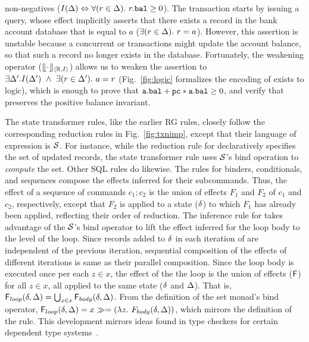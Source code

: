 non-negatives ($I(\Delta) \Leftrightarrow \forall(r\in\Delta).~r.{\tt bal}\ge
0$). The transaction starts by issuing a  query, whose
effect implicitly asserts that there exists a record in the bank
account database that is equal to $a$
($\exists(r\in\Delta).~r=a$). However, this assertion is unstable
because a concurrent  or  transactions might
update the account balance, so that such a record no longer exists in
the database.  Fortunately, the weakening operator
($\llfloor \cdot \rrfloor_{\langle \mathbb{R},I \rangle}$) allows us to weaken the assertion to $\exists
\Delta'.I(\Delta') ~\wedge~ \exists(r\in\Delta').~a=r$ (Fig.~\ref{fig:logic}
formalizes the encoding of {\sf exists} to logic), which is enough to
prove that ${\tt a.bal + pc*a.bal}\ge 0$, and verify that
 preserves the positive balance invariant.

The state transformer rules, like the earlier RG rules, closely follow
the corresponding reduction rules in Fig.~\ref{fig:txnimp}, except
that their language of expression is $\mathcal{S}$. For instance, while the
reduction rule for  declaratively specifies the set of
updated records, the state transformer rule uses $\mathcal{S}$'s bind
operation to \emph{compute} the set. Other SQL rules do likewise. The
rules for  binders, conditionals, and sequences compose the
effects inferred for their subcommands. Thus, the effect of a sequence
of commands $c_1;c_2$ is the union of effects $F_1$ and $F_2$ of $c_1$
and $c_2$, respectively, except that $F_2$ is applied to a state
($\delta$) to which $F_1$ has already been applied, reflecting their
order of reduction. The inference rule for  takes advantage
of the $\mathcal{S}$'s bind operator to lift the effect inferred for the loop
body to the level of the loop. Since records added to $\delta$ in each
iteration of  are independent of the previous iteration,
sequential composition of the effects of different iterations is same
as their parallel composition. Since the loop body is executed once
per each $z\in x$, the effect of the the loop is the union of effects
(${\sf F}$) for all $z\in x$, all applied to the same state ($\delta$ and
$\Delta$). That is, ${\sf F}_{loop}(\delta,\Delta) = \bigcup_{z\in
  x}{\sf F}_{body}(\delta,\Delta)$. From the definition of the set monad's bind
operator, ${\sf F}_{loop}(\delta,\Delta) = x \gg= (\lambda
z.~F_{body}(\delta,\Delta))$, which mirrors the definition of the rule.
This development mirrors ideas found in type checkers for certain
dependent type systems~\cite{KJ14}.




